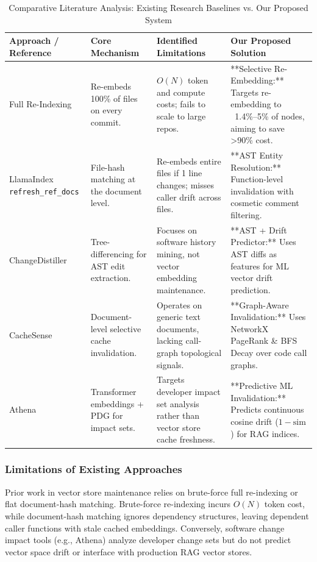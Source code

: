 \documentclass[conference]{IEEEtran}
\begin{document}
\begin{table}[htbp]
\caption{Comparative Literature Analysis: Existing Research Baselines vs. Our Proposed System}
\label{tab:lit_review}
\centering
\begin{tabular}{p{3.2cm}p{3.5cm}p{4.2cm}p{5.2cm}}
\toprule
\textbf{Approach / Reference} & \textbf{Core Mechanism} & \textbf{Identified Limitations} & \textbf{Our Proposed Solution} \\
\midrule
Full Re-Indexing \cite{gao2023retrieval} & Re-embeds 100\% of files on every commit. & $O(N)$ token and compute costs; fails to scale to large repos. & **Selective Re-Embedding:** Targets re-embedding to ~1.4\%--5\% of nodes, aiming to save >90\% cost. \\
LlamaIndex \texttt{refresh\_ref\_docs} & File-hash matching at the document level. & Re-embeds entire files if 1 line changes; misses caller drift across files. & **AST Entity Resolution:** Function-level invalidation with cosmetic comment filtering. \\
ChangeDistiller \cite{Fluri2025} & Tree-differencing for AST edit extraction. & Focuses on software history mining, not vector embedding maintenance. & **AST + Drift Predictor:** Uses AST diffs as features for ML vector drift prediction. \\
CacheSense \cite{Dang2026} & Document-level selective cache invalidation. & Operates on generic text documents, lacking call-graph topological signals. & **Graph-Aware Invalidation:** Uses NetworkX PageRank \& BFS Decay over code call graphs. \\
Athena \cite{yan2024athena} & Transformer embeddings + PDG for impact sets. & Targets developer impact set analysis rather than vector store cache freshness. & **Predictive ML Invalidation:** Predicts continuous cosine drift ($1 - \text{sim}$) for RAG indices. \\
\bottomrule
\end{tabular}
\end{table}

\subsubsection{Limitations of Existing Approaches}
Prior work in vector store maintenance relies on brute-force full re-indexing or flat document-hash matching. Brute-force re-indexing incurs $O(N)$ token cost, while document-hash matching ignores dependency structures, leaving dependent caller functions with stale cached embeddings. Conversely, software change impact tools (e.g., Athena) analyze developer change sets but do not predict vector space drift or interface with production RAG vector stores.
\end{document}
